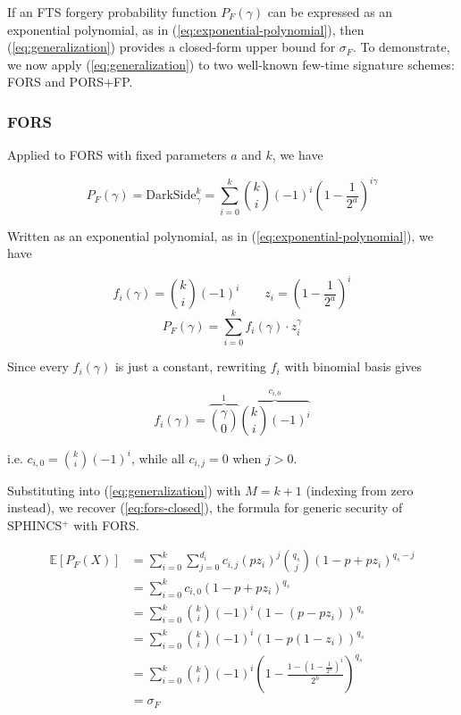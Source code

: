 \documentclass[11pt]{article}
\newcommand{\spx}{SPHINCS$^+$\xspace}
\begin{document}
If an FTS forgery probability function $P_F(\gamma)$ can be expressed as an exponential polynomial, as in (\ref{eq:exponential-polynomial}), then (\ref{eq:generalization}) provides a closed-form upper bound for $\sigma_F$. To demonstrate, we now apply (\ref{eq:generalization}) to two well-known few-time signature schemes: FORS and PORS+FP.

\subsubsection{FORS}

Applied to FORS with fixed parameters $a$ and $k$, we have

\begin{equation}
  P_F(\gamma) = \mathrm{DarkSide}_\gamma^k = \sum_{i=0}^k \binom{k}{i} (-1)^i \left( 1 - \frac{1}{2^a} \right)^{i \gamma}
\end{equation}

Written as an exponential polynomial, as in (\ref{eq:exponential-polynomial}), we have

\begin{equation}
  f_i(\gamma) = \binom{k}{i} (-1)^i
    \quad \quad
  z_i = \left( 1 - \frac{1}{2^a} \right)^i
\end{equation}
\begin{equation}
  P_F(\gamma) = \sum_{i=0}^k f_i(\gamma) \cdot z_i^\gamma
\end{equation}

Since every $f_i(\gamma)$ is just a constant, rewriting $f_i$ with binomial basis gives

\begin{equation}
  f_i(\gamma) = \overbrace{\binom{\gamma}{0}}^1 \overbrace{\binom{k}{i} (-1)^i}^{c_{i, 0}}
\end{equation}

i.e. $c_{i, 0} = \binom{k}{i} (-1)^i$, while all $c_{i, j} = 0$ when $j > 0$.

Substituting into (\ref{eq:generalization}) with $M = k + 1$ (indexing from zero instead), we recover (\ref{eq:fors-closed}), the formula for generic security of \spx with FORS.

\begin{align}
  \mathbb E[P_F(X)]
    &= \sum_{i = 0}^k \sum_{j=0}^{d_i} c_{i, j} (p z_i)^j \binom{q_s}{j} \left(1 - p + p z_i \right)^{q_s - j} \\
    &= \sum_{i = 0}^k c_{i, 0} \left(1 - p + p z_i \right)^{q_s} \\
    &= \sum_{i = 0}^k \binom{k}{i} (-1)^i \left(1 - (p - p z_i) \right)^{q_s} \\
    &= \sum_{i = 0}^k \binom{k}{i} (-1)^i \left(1 - p \left( 1 - z_i \right) \right)^{q_s} \\
    &= \sum_{i = 0}^k \binom{k}{i} (-1)^i \left(1 - \frac{1 - \left( 1 - \frac{1}{2^a} \right)^i}{2^h} \right)^{q_s} \\
    &= \sigma_F
\end{align}
\end{document}
